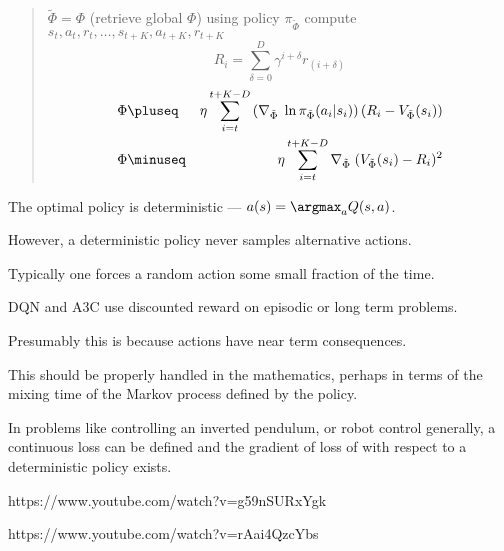 {

\begin{quotation}
  \noindent $\tilde{\Phi} = \Phi$ (retrieve global $\Phi$)\newline
  \noindent using policy $\pi_{\tilde{\Phi}}$ compute $s_t,a_t,r_t,\ldots,s_{t+K},a_{t+K},r_{t+K}$
  $$R_i = \sum_{\delta=0}^D \gamma^{i+\delta} r_{(i+\delta)}$$
  \begin{eqnarray*}
  \Phi  &\pluseq & \eta \sum_{i=t}^{t+K-D} \left(\nabla_{\tilde{\Phi}}\;\ln \pi_{\tilde{\Phi}}(a_i|s_i)\right)\left(R_i - V_{\tilde{\Phi}}(s_i)\right)\\
  \Phi & \minuseq & \eta \sum_{i=t}^{t+K-D} \nabla_{\tilde{\Phi}}\;(V_{\tilde{\Phi}}(s_i) - R_i)^2
  \end{eqnarray*}
\end{quotation}


The optimal policy is deterministic --- $a(s) = \argmax_a Q(s,a)$.

\vfill
However, a deterministic policy never samples alternative actions.

\vfill
Typically one forces a random action some small fraction of the time.



DQN and A3C use discounted reward on episodic or long term problems.

\vfill
Presumably this is because actions have near term consequences.

\vfill
This should be properly handled in the mathematics, perhaps in terms of the mixing time of
the Markov process defined by the policy.


In problems like controlling an inverted pendulum, or robot control generally,
a continuous loss can be defined and the gradient of loss of with respect to a deterministic policy exists.


https://www.youtube.com/watch?v=g59nSURxYgk

https://www.youtube.com/watch?v=rAai4QzcYbs




}



